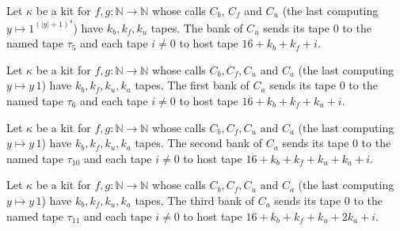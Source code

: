 \begin{definition}
\label{Turing.NTimeDiag.QyKit.bPu}
\leanok
{}
Let $\kappa$ be a kit for $f, g : \mathbb{N} \to \mathbb{N}$ whose calls $C_b$, $C_f$ and $C_u$ (the
last computing $y \mapsto 1^{(|y|+1)^4}$) have $k_b, k_f, k_u$ tapes. The bank of $C_u$ sends its
tape $0$ to the named tape $\tau_5$ and each tape $i \ne 0$ to host tape $16 + k_b + k_f + i$.
\end{definition}

\begin{definition}
\label{Turing.NTimeDiag.QyKit.bAb0}
\leanok
{}
Let $\kappa$ be a kit for $f, g : \mathbb{N} \to \mathbb{N}$ whose calls $C_b, C_f, C_u$ and $C_a$
(the last computing $y \mapsto y\,1$) have $k_b, k_f, k_u, k_a$ tapes. The first bank of $C_a$
sends its tape $0$ to the named tape $\tau_6$ and each tape $i \ne 0$ to host tape
$16 + k_b + k_f + k_u + i$.
\end{definition}

\begin{definition}
\label{Turing.NTimeDiag.QyKit.bAbJ}
\leanok
{}
Let $\kappa$ be a kit for $f, g : \mathbb{N} \to \mathbb{N}$ whose calls $C_b, C_f, C_u$ and $C_a$
(the last computing $y \mapsto y\,1$) have $k_b, k_f, k_u, k_a$ tapes. The second bank of $C_a$
sends its tape $0$ to the named tape $\tau_{10}$ and each tape $i \ne 0$ to host tape
$16 + k_b + k_f + k_u + k_a + i$.
\end{definition}

\begin{definition}
\label{Turing.NTimeDiag.QyKit.bAbK}
\leanok
{}
Let $\kappa$ be a kit for $f, g : \mathbb{N} \to \mathbb{N}$ whose calls $C_b, C_f, C_u$ and $C_a$
(the last computing $y \mapsto y\,1$) have $k_b, k_f, k_u, k_a$ tapes. The third bank of $C_a$
sends its tape $0$ to the named tape $\tau_{11}$ and each tape $i \ne 0$ to host tape
$16 + k_b + k_f + k_u + 2k_a + i$.
\end{definition}

